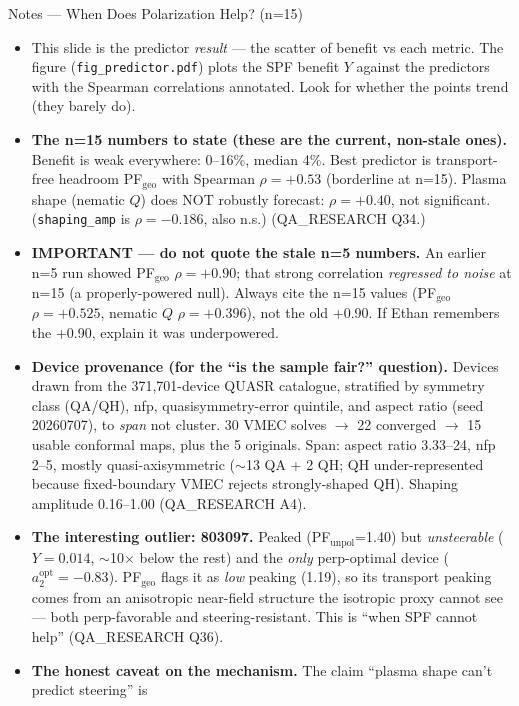 \documentclass[11pt,aspectratio=169]{beamer}
\begin{document}
\begin{frame}[allowframebreaks]{Notes --- When Does Polarization Help? (n=15)}
{\color{red}\footnotesize
\begin{itemize}
\item This slide is the predictor \emph{result} --- the scatter of benefit vs each metric. The figure
      (\texttt{fig\_predictor.pdf}) plots the SPF benefit $Y$ against the predictors with the Spearman
      correlations annotated. Look for whether the points trend (they barely do).
\item \textbf{The n=15 numbers to state (these are the current, non-stale ones).} Benefit is weak
      everywhere: 0--16\%, median 4\%. Best predictor is transport-free headroom PF$_\text{geo}$ with
      Spearman $\rho=+0.53$ (borderline at n=15). Plasma shape (nematic $Q$) does NOT robustly forecast:
      $\rho=+0.40$, not significant. (\texttt{shaping\_amp} is $\rho=-0.186$, also n.s.)
      (QA\_RESEARCH Q34.)
\item \textbf{IMPORTANT --- do not quote the stale n=5 numbers.} An earlier n=5 run showed
      PF$_\text{geo}$ $\rho=+0.90$; that strong correlation \emph{regressed to noise} at n=15 (a
      properly-powered null). Always cite the n=15 values (PF$_\text{geo}$ $\rho=+0.525$, nematic $Q$
      $\rho=+0.396$), not the old +0.90. If Ethan remembers the +0.90, explain it was underpowered.
\item \textbf{Device provenance (for the ``is the sample fair?'' question).} Devices drawn from the
      371,701-device QUASR catalogue, stratified by symmetry class (QA/QH), nfp, quasisymmetry-error
      quintile, and aspect ratio (seed 20260707), to \emph{span} not cluster. 30 VMEC solves $\to$ 22
      converged $\to$ 15 usable conformal maps, plus the 5 originals. Span: aspect ratio 3.33--24, nfp
      2--5, mostly quasi-axisymmetric ($\sim$13 QA + 2 QH; QH under-represented because fixed-boundary
      VMEC rejects strongly-shaped QH). Shaping amplitude 0.16--1.00 (QA\_RESEARCH A4).
\item \textbf{The interesting outlier: 803097.} Peaked (PF$_\text{unpol}$=1.40) but \emph{unsteerable}
      ($Y=0.014$, $\sim$10$\times$ below the rest) and the \emph{only} perp-optimal device ($a_2^\text{opt}=
      -0.83$). PF$_\text{geo}$ flags it as \emph{low} peaking (1.19), so its transport peaking comes from
      an anisotropic near-field structure the isotropic proxy cannot see --- both perp-favorable and
      steering-resistant. This is ``when SPF cannot help'' (QA\_RESEARCH Q36).
\item \textbf{The honest caveat on the mechanism.} The claim ``plasma shape can't predict steering'' is

\end{itemize}}
\end{frame}
\end{document}
